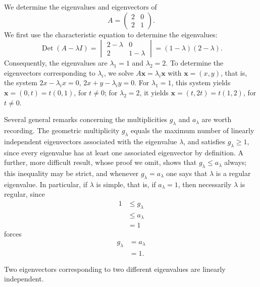\begin{example}
We determine the eigenvalues and eigenvectors of
\[
A = \begin{pmatrix} 2 & 0 \\ 2 & 1 \end{pmatrix}.
\]
We first use the characteristic equation to determine the eigenvalues:
\[
\operatorname{Det}(A - \lambda I) = \begin{vmatrix} 2-\lambda & 0 \\ 2 & 1-\lambda \end{vmatrix} = (1-\lambda)(2-\lambda).
\]
Consequently, the eigenvalues are $\lambda_1 = 1$ and $\lambda_2 = 2$. To determine the eigenvectors corresponding to $\lambda_i$, we solve $A\mathbf{x} = \lambda_i \mathbf{x}$ with $\mathbf{x} = (x,y)$, that is, the system $2x - \lambda_i x = 0$, $2x + y - \lambda_i y = 0$. For $\lambda_1 = 1$, this system yields $\mathbf{x} = (0,t) = t(0,1)$, for $t \neq 0$; for $\lambda_2 = 2$, it yields $\mathbf{x} = (t, 2t) = t(1,2)$, for $t \neq 0$.
\end{example}

Several general remarks concerning the multiplicities $g_\lambda$ and $a_\lambda$ are worth recording. The geometric multiplicity $g_\lambda$ equals the maximum number of linearly independent eigenvectors associated with the eigenvalue $\lambda$, and satisfies $g_\lambda \geq 1$, since every eigenvalue has at least one associated eigenvector by definition. A further, more difficult result, whose proof we omit, shows that $g_\lambda \leq a_\lambda$ always; this inequality may be strict, and whenever $g_\lambda = a_\lambda$ one says that $\lambda$ is a regular eigenvalue. In particular, if $\lambda$ is simple, that is, if $a_\lambda = 1$, then necessarily $\lambda$ is regular, since
\[
\begin{aligned}
1 &\leq g_\lambda \\
&\leq a_\lambda \\
&= 1
\end{aligned}
\]
forces
\[
\begin{aligned}
g_\lambda &= a_\lambda \\
&= 1.
\end{aligned}
\]

\begin{proposition}
Two eigenvectors corresponding to two different eigenvalues are linearly independent.
\end{proposition}

